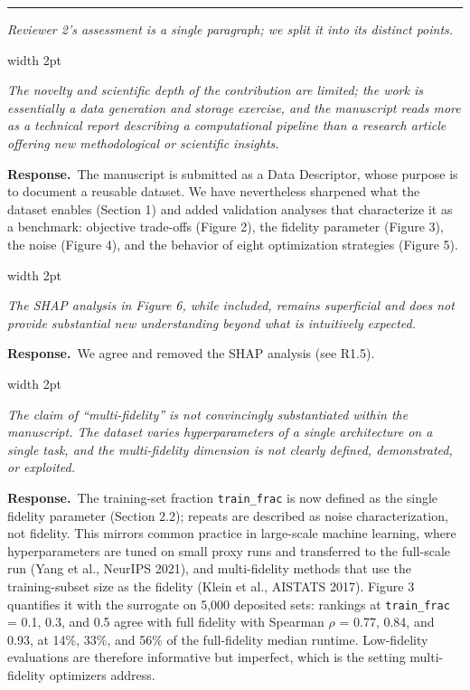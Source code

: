 \documentclass[11pt]{article}
\newenvironment{comment}
  {\par\medskip\noindent
   \begingroup\color{revrule}\leaders\vrule width 2pt\hfill\kern0pt\par\nobreak
   \endgroup
   \begin{list}{}{\setlength{\leftmargin}{1.5em}\setlength{\rightmargin}{0.5em}}%
   \item\itshape\ignorespaces}
  {\end{list}\par}
\newcommand{\response}{\par\noindent\textbf{\color{respblue}Response.}\ }
\newcommand{\reviewer}[1]{\bigskip\noindent{\large\bfseries #1}\par
  \rule{\linewidth}{0.8pt}\par}
\begin{document}
\reviewer{Reviewer 2}

\noindent\emph{Reviewer 2's assessment is a single paragraph; we split it into its distinct points.}

\begin{comment}
The novelty and scientific depth of the contribution are limited; the work is essentially a data generation and storage exercise, and the manuscript reads more as a technical report describing a computational pipeline than a research article offering new methodological or scientific insights.
\end{comment}
\response The manuscript is submitted as a Data Descriptor, whose purpose is to document a reusable dataset. We have nevertheless sharpened what the dataset enables (Section 1) and added validation analyses that characterize it as a benchmark: objective trade-offs (Figure 2), the fidelity parameter (Figure 3), the noise (Figure 4), and the behavior of eight optimization strategies (Figure 5).

\begin{comment}
The SHAP analysis in Figure 6, while included, remains superficial and does not provide substantial new understanding beyond what is intuitively expected.
\end{comment}
\response We agree and removed the SHAP analysis (see R1.5).

\begin{comment}
The claim of ``multi-fidelity'' is not convincingly substantiated within the manuscript. The dataset varies hyperparameters of a single architecture on a single task, and the multi-fidelity dimension is not clearly defined, demonstrated, or exploited.
\end{comment}
\response The training-set fraction \texttt{train\_frac} is now defined as the single fidelity parameter (Section 2.2); repeats are described as noise characterization, not fidelity. This mirrors common practice in large-scale machine learning, where hyperparameters are tuned on small proxy runs and transferred to the full-scale run (Yang et al., NeurIPS 2021), and multi-fidelity methods that use the training-subset size as the fidelity (Klein et al., AISTATS 2017). Figure 3 quantifies it with the surrogate on 5,000 deposited sets: rankings at \texttt{train\_frac} = 0.1, 0.3, and 0.5 agree with full fidelity with Spearman $\rho$ = 0.77, 0.84, and 0.93, at 14\%, 33\%, and 56\% of the full-fidelity median runtime. Low-fidelity evaluations are therefore informative but imperfect, which is the setting multi-fidelity optimizers address.
\end{document}

